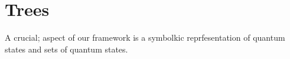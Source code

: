 \section{Trees}
A crucial; aspect of our framework is a symbolkic reprfesentation of quantum states and sets of quantum states.

